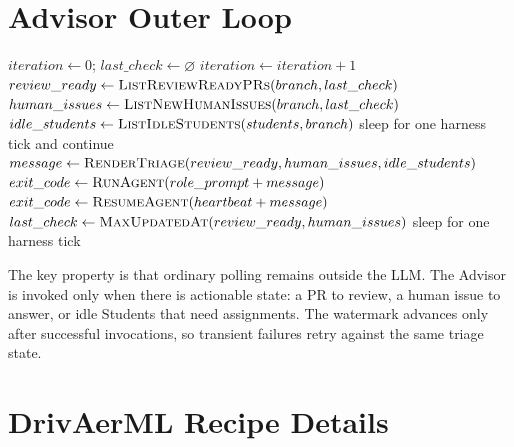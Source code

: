 \documentclass{article}
\begin{document}
\section{Advisor Outer Loop}
\label{app:outer-loop}

\begin{algorithm}[h]
  \caption{Advisor triage loop outside the LLM context}
  \label{alg:advisor-outer-loop}
  \begin{algorithmic}[1]
    \STATE $iteration \leftarrow 0$; $last\_check \leftarrow \varnothing$
      \STATE $iteration \leftarrow iteration + 1$
      \STATE $review\_ready \leftarrow \textsc{ListReviewReadyPRs}(branch, last\_check)$
      \STATE $human\_issues \leftarrow \textsc{ListNewHumanIssues}(branch, last\_check)$
      \STATE $idle\_students \leftarrow \textsc{ListIdleStudents}(students, branch)$
        \STATE sleep for one harness tick and continue
      \ENDIF
      \STATE $message \leftarrow \textsc{RenderTriage}(review\_ready, human\_issues, idle\_students)$
        \STATE $exit\_code \leftarrow \textsc{RunAgent}(role\_prompt + message)$
      \ELSE
        \STATE $exit\_code \leftarrow \textsc{ResumeAgent}(heartbeat + message)$
      \ENDIF
        \STATE $last\_check \leftarrow \textsc{MaxUpdatedAt}(review\_ready, human\_issues)$
      \ENDIF
      \STATE sleep for one harness tick
    \ENDWHILE
  \end{algorithmic}
\end{algorithm}

The key property is that ordinary polling remains outside the LLM. The Advisor is invoked only when there is actionable state: a PR to review, a human issue to answer, or idle Students that need assignments. The watermark advances only after successful invocations, so transient failures retry against the same triage state.

\clearpage
\section{DrivAerML Recipe Details}
\label{app:drivaerml-recipe}
\end{document}
